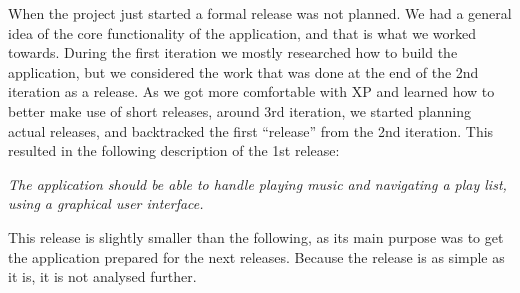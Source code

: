 When the project just started a formal release was not planned. We had a general idea of the core functionality of the application, and that is what we worked towards. During the first iteration we mostly researched how to build the application, but we considered the work that was done at the end of the 2nd iteration as a release. As we got more comfortable with XP and learned how to better make use of short releases, around 3rd iteration, we started planning actual releases, and backtracked the first ``release'' from the 2nd iteration. This resulted in the following description of the 1st release:

\textit{The application should be able to handle playing music and navigating a play list, using a graphical user interface.}

This release is slightly smaller than the following, as its main purpose was to get the application prepared for the next releases. Because the release is as simple as it is, it is not analysed further.
